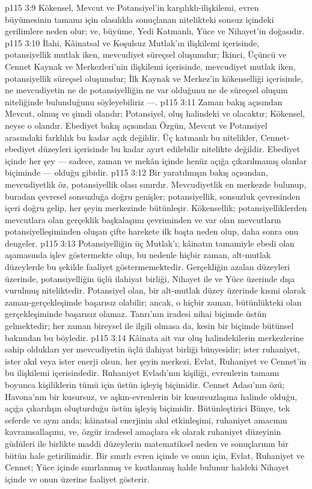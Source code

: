 \vs p115 3:9 Kökensel, Mevcut ve Potansiyel’in karşılıklı\hyp{}ilişkilemi, evren büyümesinin tamamı için olasılıkla sonuçlanan nitelikteki sonsuz içindeki gerilimlere neden olur; ve, büyüme, Yedi Katmanlı, Yüce ve Nihayet’in doğasıdır.
\vs p115 3:10 İlahi, Kâinatsal ve Koşulsuz Mutlak’ın ilişkilemi içerisinde, potansiyellik mutlak iken, mevcudiyet süreçsel oluşumdur; İkinci, Üçüncü ve Cennet Kaynak ve Merkezleri’nin ilişkilemi içerisinde, mevcudiyet mutlak iken, potansiyellik süreçsel oluşumdur; İlk Kaynak ve Merkez’in kökenselliği içerisinde, ne mevcudiyetin ne de potansiyelliğin ne var olduğunu ne de süreçsel oluşum niteliğinde bulunduğunu söyleyebiliriz ---.
\vs p115 3:11 Zaman bakış açısından Mevcut, olmuş ve şimdi olandır; Potansiyel, oluş halindeki ve olacaktır; Kökensel, neyse o olandır. Ebediyet bakış açısından Özgün, Mevcut ve Potansiyel arasındaki farklılık bu kadar açık değildir. Üç katmanlı bu nitelikler, Cennet\hyp{}ebediyet düzeyleri içerisinde bu kadar ayırt edilebilir nitelikte değildir. Ebediyet içinde her şey --- sadece, zaman ve mekân içinde henüz açığa çıkarılmamış olanlar biçiminde --- olduğu gibidir.
\vs p115 3:12 Bir yaratılmışın bakış açısından, mevcudiyetlik öz, potansiyellik olası sınırdır. Mevcudiyetlik en merkezde bulunup, buradan çevresel sonsuzluğa doğru genişler; potansiyellik, sonsuzluk çevresinden içeri doğru gelip, her şeyin merkezinde bütünleşir. Kökensellik; potansiyelliklerden mevcutlara olan gerçeklik başkalaşımı çevriminden ve var olan mevcutların potansiyelleşiminden oluşan çifte harekete ilk başta neden olup, daha sonra onu dengeler.
\vs p115 3:13 Potansiyelliğin üç Mutlak’ı; kâinatın tamamiyle ebedi olan aşamasında işlev göstermekte olup, bu nedenle hiçbir zaman, alt\hyp{}mutlak düzeylerde bu şekilde faaliyet göstermemektedir. Gerçekliğin azalan düzeyleri üzerinde, potansiyelliğin üçlü ilahiyat birliği, Nihayet ile ve Yüce üzerinde dışa vurulmuş niteliktedir. Potansiyel olan, bir alt\hyp{}mutlak düzey üzerinde kısmi olarak zaman\hyp{}gerçekleşimde başarısız olabilir; ancak, o hiçbir zaman, bütünlükteki olan gerçekleşiminde başarısız olamaz. Tanrı’nın iradesi nihai biçimde üstün gelmektedir; her zaman bireysel ile ilgili olmasa da, kesin bir biçimde bütünsel bakımdan bu böyledir.
\vs p115 3:14 Kâinata ait var oluş halindekilerin merkezlerine sahip oldukları yer mevcudiyetin üçlü ilahiyat birliği bünyesidir; ister ruhaniyet, ister akıl veya ister enerji olsun, her şeyin merkezi, Evlat, Ruhaniyet ve Cennet’in bu ilişkilemi içerisindedir. Ruhaniyet Evladı’nın kişiliği, evrenlerin tamamı boyunca kişiliklerin tümü için üstün işleyiş biçimidir. Cennet Adası’nın özü; Havona’nın bir kusursuz, ve aşkın\hyp{}evrenlerin bir kusursuzlaşma halinde olduğu, açığa çıkarılışın oluşturduğu üstün işleyiş biçimidir. Bütünleştirici Bünye, tek seferde ve aynı anda; kâinatsal enerjinin akıl etkinleşimi, ruhaniyet amacının kavramsallaşımı, ve, özgür iradesel amaçlara ek olarak ruhaniyet düzeyinin güdüleri ile birlikte maddi düzeylerin matematiksel neden ve sonuçlarının bir bütün hale getirilimidir. Bir sınırlı evren içinde ve onun için, Evlat, Ruhaniyet ve Cennet; Yüce içinde sınırlanmış ve kısıtlanmış halde bulunur haldeki Nihayet içinde ve onun üzerine faaliyet gösterir.
